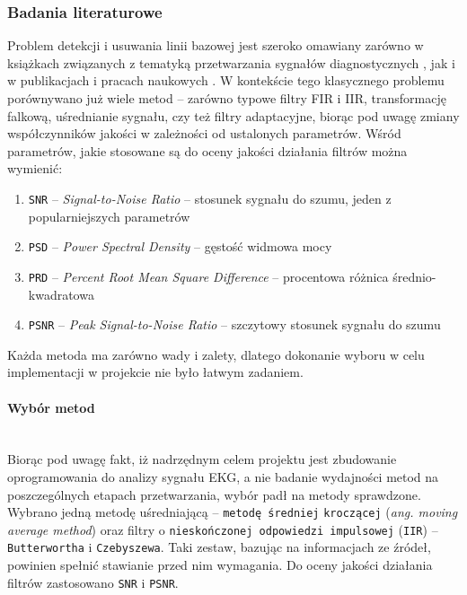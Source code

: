 \documentclass[a4paper, 11pt]{article}
\begin{document}
\subsubsection{Badania literaturowe}
\label{sec:baseline:papers}
Problem detekcji i usuwania linii bazowej jest szeroko omawiany zarówno w książkach związanych z tematyką przetwarzania sygnałów diagnostycznych \cite{AUGUST1}, jak i w publikacjach i pracach naukowych \cite{KAUR1}\cite{MUKA1}. W kontekście tego klasycznego problemu porównywano już wiele metod -- zarówno typowe filtry FIR i IIR, transformację falkową, uśrednianie sygnału, czy też filtry adaptacyjne, biorąc pod uwagę zmiany współczynników jakości w zależności od ustalonych parametrów. Wśród parametrów, jakie stosowane są do oceny jakości działania filtrów można wymienić:
\begin{enumerate}
\item \verb+SNR+  -- \textit{Signal-to-Noise Ratio} --  stosunek sygnału do szumu, jeden z popularniejszych parametrów
\item \verb+PSD+  -- \textit{Power Spectral Density} -- gęstość widmowa mocy
\item \verb+PRD+  -- \textit{Percent Root Mean Square Difference} -- procentowa różnica średnio-kwadratowa
\item \verb+PSNR+  -- \textit{Peak Signal-to-Noise Ratio} -- szczytowy stosunek sygnału do szumu
\end{enumerate}
Każda metoda ma zarówno wady i zalety, dlatego dokonanie wyboru w celu implementacji w projekcie nie było łatwym zadaniem.

\paragraph{Wybór metod}
\mbox{} \\
Biorąc pod uwagę fakt, iż nadrzędnym celem projektu jest zbudowanie oprogramowania do analizy sygnału EKG, a nie badanie wydajności metod na poszczególnych etapach przetwarzania, wybór padł na metody sprawdzone. Wybrano jedną metodę uśredniającą -- \verb|metodę średniej| \verb|kroczącej| (\textit{ang. moving average method}) oraz filtry o \verb|nieskończonej odpowiedzi impulsowej| (\verb|IIR|) -- \verb|Butterwortha| i \verb|Czebyszewa|. Taki zestaw, bazując na informacjach ze źródeł, powinien spełnić stawianie przed nim wymagania. Do oceny jakości działania filtrów zastosowano \verb|SNR| i \verb|PSNR|.
\end{document}
